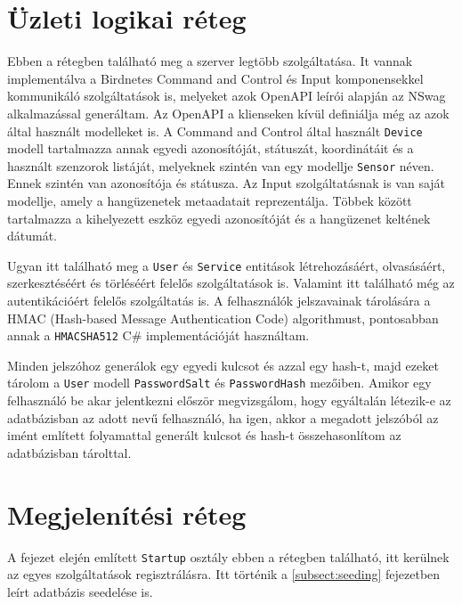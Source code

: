 \section{Üzleti logikai réteg}
Ebben a rétegben található meg a szerver legtöbb szolgáltatása. It vannak implementálva a Birdnetes Command and Control és Input komponensekkel kommunikáló szolgáltatások is, 
melyeket azok OpenAPI leírói alapján az NSwag\cite{nswag} alkalmazással generáltam. Az OpenAPI a klienseken kívül definiálja még az azok által használt modelleket is.
A Command and Control által használt \verb+Device+ modell tartalmazza annak egyedi azonosítóját, státuszát, koordinátáit és a használt szenzorok listáját, 
melyeknek szintén van egy modellje \verb+Sensor+ néven. Ennek szintén van azonosítója és státusza. Az Input szolgáltatásnak is van saját modellje, 
amely a hangüzenetek metaadatait reprezentálja. Többek között tartalmazza a kihelyezett eszköz egyedi azonosítóját és a hangüzenet keltének dátumát. 

Ugyan itt található meg a \verb+User+ és \verb+Service+ entitások létrehozásáért, olvasásáért, szerkesztéséért és törléséért felelős szolgáltatások is.
Valamint itt található még az autentikációért felelős szolgáltatás is. A felhasználók jelszavainak tárolására a HMAC (Hash-based Message Authentication Code) algorithmust, 
pontosabban annak a \verb+HMACSHA512+\cite{hmacsha512} C\# implementációját használtam.

Minden jelszóhoz generálok egy egyedi kulcsot és azzal egy hash-t, majd ezeket tárolom a \verb+User+ modell \verb+PasswordSalt+ és \verb+PasswordHash+ mezőiben.
Amikor egy felhasználó be akar jelentkezni először megvizsgálom, hogy egyáltalán létezik-e az adatbázisban az adott nevű felhasználó, 
ha igen, akkor a megadott jelszóból az imént említett folyamattal generált kulcsot és hash-t összehasonlítom az adatbázisban tárolttal.

\section{Megjelenítési réteg}
A fejezet elején említett \verb+Startup+ osztály ebben a rétegben található, itt kerülnek az egyes szolgáltatások regisztrálásra.
Itt történik a \ref{subsect:seeding} fejezetben leírt adatbázis seedelése is.

